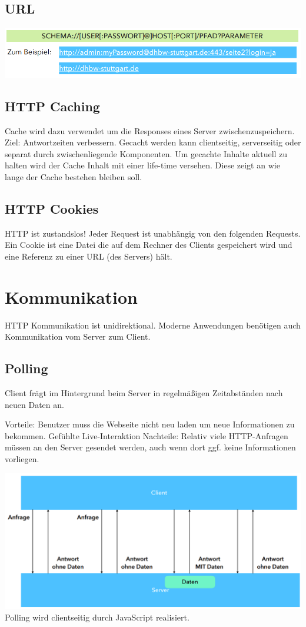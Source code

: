\documentclass[12pt,a4paper]{article}
\begin{document}
\subsection{URL}
\includegraphics[width=\textwidth]{Bilder/URL.PNG}

\subsection{HTTP Caching}
Cache wird dazu verwendet um die Responses eines Server zwischenzuspeichern. Ziel: Antwortzeiten verbessern. Gecacht werden kann clientseitig, serverseitig oder separat durch zwischenliegende Komponenten. Um gecachte Inhalte aktuell zu halten wird der Cache Inhalt mit einer life-time versehen. Diese zeigt an wie lange der Cache bestehen bleiben soll. 

\subsection{HTTP Cookies}
HTTP ist zustandslos! Jeder Request ist unabhängig von den folgenden Requests. Ein Cookie ist eine Datei die auf dem Rechner des Clients gespeichert wird und eine Referenz zu einer URL (des Servers) hält.

\section{Kommunikation}
HTTP Kommunikation ist unidirektional. Moderne Anwendungen benötigen auch Kommunikation vom Server zum Client.

\subsection{Polling}
Client frägt im Hintergrund beim Server in regelmäßigen Zeitabständen nach neuen Daten an. \\
\begin{outline}
	\1 Vorteile:
		\2 Benutzer muss die Webseite nicht neu laden um neue Informationen zu bekommen.
		\2 Gefühlte Live-Interaktion
	\1 Nachteile:
		\2 Relativ viele HTTP-Anfragen müssen an den Server gesendet werden, auch wenn dort ggf. keine Informationen vorliegen.
\end{outline}
\includegraphics[width=\textwidth]{Bilder/polling.PNG}
Polling wird clientseitig durch JavaScript realisiert.
\end{document}
